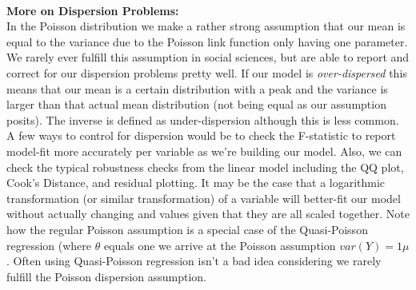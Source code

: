 \documentclass[12pt]{article}\usepackage[]{graphicx}\usepackage[]{color}
\begin{document}
\begin{flushleft}
\hfill \\
\noindent \textbf{More on Dispersion Problems:}\\
In the Poisson distribution we make a rather strong assumption that our mean is equal to the variance due to the Poisson link function only having one parameter. We rarely ever fulfill this assumption in social sciences, but are able to report and correct for our dispersion problems pretty well. If our model is \textit{over-dispersed} this means that our mean is a certain distribution with a peak and the variance is larger than that actual mean distribution (not being equal as our assumption posits). The inverse is defined as under-dispersion although this is less common. A few ways to control for dispersion would be to check the F-statistic to report model-fit more accurately per variable as we're building our model. Also, we can check the typical robustness checks from the linear model including the QQ plot, Cook's Distance, and residual plotting. It may be the case that a logarithmic transformation (or similar transformation) of a variable will better-fit our model without actually changing and values given that they are all scaled together. Note how the regular Poisson assumption is a special case of the Quasi-Poisson regression (where $\theta$ equals one we arrive at the Poisson assumption $var(Y)=1\mu$. Often using Quasi-Poisson regression isn't a bad idea considering we rarely fulfill the Poisson dispersion assumption.\\


\end{flushleft}
\end{document}
